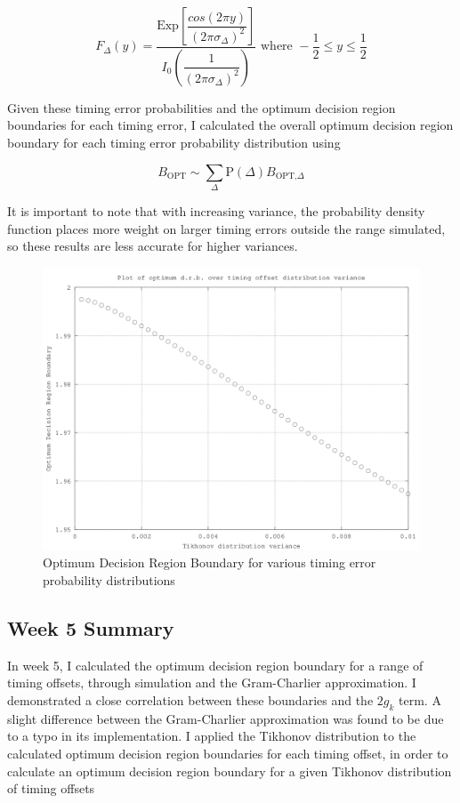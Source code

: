 \[
F_{\Delta} (y) = \frac{\text{Exp}\left [ \dfrac{cos(2 \pi y)}{(2 \pi \sigma_{\Delta})^2} \right ]}{I_0 \left ( \dfrac{1}{(2 \pi \sigma_{\Delta})^2} \right )} \text{  where  } -\frac{1}{2} \le y \le \frac{1}{2}
\]

Given these timing error probabilities and the optimum decision region
boundaries for each timing error, I calculated the overall optimum
decision region boundary for each timing error probability distribution
using

\[
B_{\text{OPT}} \sim \sum_{\Delta} \text{P}(\Delta) B_{\text{OPT,}\Delta}
\]

It is important to note that with increasing variance, the probability
density function places more weight on larger timing errors outside the
range simulated, so these results are less accurate for higher
variances.

\begin{figure}[htbp]
\centering
\includegraphics[width=\linewidth]{../../../plots/odrb_vs_tikhvar.png}
\caption{Optimum Decision Region Boundary for various timing error
probability distributions}
\end{figure}

\subsection{Week 5 Summary}

In week 5, I calculated the optimum decision region boundary for a range
of timing offsets, through simulation and the Gram-Charlier
approximation. I demonstrated a close correlation between these
boundaries and the $2 g_k$ term. A slight difference between the
Gram-Charlier approximation was found to be due to a typo in its
implementation. I applied the Tikhonov distribution to the calculated
optimum decision region boundaries for each timing offset, in order to
calculate an optimum decision region boundary for a given Tikhonov
distribution of timing offsets

